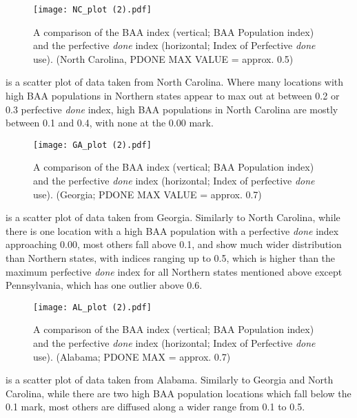 \documentclass[output=paper,draftmode,colorlinks,citecolor=brown]{langscibook}
\begin{document}
 
\begin{figure}[p]
\texttt{[image: NC\_plot (2).pdf]}
\caption{\label{fig:baxter:8} A comparison of the BAA index (vertical; BAA Population index) and the perfective \textit{done} index (horizontal; Index of Perfective \textit{done} use). (North Carolina, PDONE MAX VALUE = approx. 0.5)}
\end{figure}

 is a scatter plot of data taken from North Carolina. Where many locations with high BAA populations in Northern states appear to max out at between 0.2 or 0.3 perfective \textit{done} index, high BAA populations in North Carolina are mostly between 0.1 and 0.4, with none at the 0.00 mark.


 
\begin{figure}[p]
\texttt{[image: GA\_plot (2).pdf]}
\caption{\label{fig:baxter:9} A comparison of the BAA index (vertical; BAA Population index) and the perfective \textit{done} index (horizontal; Index of perfective \textit{done} use). (Georgia; PDONE MAX VALUE = approx. 0.7)}
\end{figure}



 is a scatter plot of data taken from Georgia. Similarly to North Carolina, while there is one location with a high BAA population with a perfective \textit{done} index approaching 0.00, most others fall above 0.1, and show much wider distribution than Northern states, with indices ranging up to 0.5, which is higher than the maximum perfective \textit{done} index for all Northern states mentioned above except Pennsylvania, which has one outlier above 0.6.


\begin{figure}[p]
\texttt{[image: AL\_plot (2).pdf]}
\caption{\label{fig:baxter:10}A comparison of the BAA index (vertical; BAA Population index) and the perfective \textit{done} index (horizontal; Index of Perfective \textit{done} use). (Alabama; PDONE MAX = approx. 0.7)}
\end{figure}


 is a scatter plot of data taken from Alabama. Similarly to Georgia and North Carolina, while there are two high BAA population locations which fall below the 0.1 mark, most others are diffused along a wider range from 0.1 to 0.5.
\end{document}
